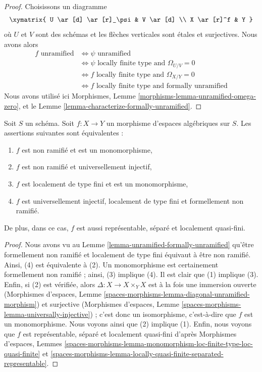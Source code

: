 \begin{proof}
Choisissons un diagramme
$$
\xymatrix{
U \ar[d] \ar[r]_\psi & V \ar[d] \\
X \ar[r]^f & Y
}
$$
où $U$ et $V$ sont des schémas et les flèches verticales sont étales et
surjectives. Nous avons alors
\begin{align*}
f\text{ unramified}
& \Leftrightarrow
\psi\text{ unramified} \\
& \Leftrightarrow
\psi\text{ locally finite type and }\Omega_{U/V} = 0 \\
& \Leftrightarrow
f\text{ locally finite type and }\Omega_{X/Y} = 0 \\
& \Leftrightarrow
f\text{ locally finite type and formally unramified}
\end{align*}
Nous avons utilisé ici
Morphismes, Lemme \ref{morphisms-lemma-unramified-omega-zero}, et le
Lemme \ref{lemma-characterize-formally-unramified}.
\end{proof}

\begin{lemma}
\label{lemma-universally-injective-unramified}
Soit $S$ un schéma.
Soit $f : X \to Y$ un morphisme d'espaces algébriques sur $S$.
Les assertions suivantes sont équivalentes :
\begin{enumerate}
\item $f$ est non ramifié et est un monomorphisme,
\item $f$ est non ramifié et universellement injectif,
\item $f$ est localement de type fini et est un monomorphisme,
\item $f$ est universellement injectif, localement de type fini et
formellement non ramifié.
\end{enumerate}
De plus, dans ce cas, $f$ est aussi représentable, séparé et
localement quasi-fini.
\end{lemma}

\begin{proof}
Nous avons vu au
Lemme \ref{lemma-unramified-formally-unramified}
qu'être formellement non ramifié et localement de type fini équivaut
à être non ramifié.
Ainsi, (4) est équivalente à (2).
Un monomorphisme est certainement formellement non ramifié ; ainsi, (3) implique (4).
Il est clair que (1) implique (3). Enfin, si (2) est vérifiée, alors
$\Delta : X \to X \times_Y X$ est à la fois une immersion ouverte
(Morphismes d'espaces, Lemme
\ref{spaces-morphisms-lemma-diagonal-unramified-morphism})
et surjective
(Morphismes d'espaces, Lemme
\ref{spaces-morphisms-lemma-universally-injective}) ;
c'est donc un isomorphisme, c'est-à-dire que $f$ est un monomorphisme. Nous voyons ainsi que
(2) implique (1).
Enfin, nous voyons que $f$ est représentable, séparé et localement
quasi-fini d'après
Morphismes d'espaces, Lemmes
\ref{spaces-morphisms-lemma-monomorphism-loc-finite-type-loc-quasi-finite} et
\ref{spaces-morphisms-lemma-locally-quasi-finite-separated-representable}.
\end{proof}

